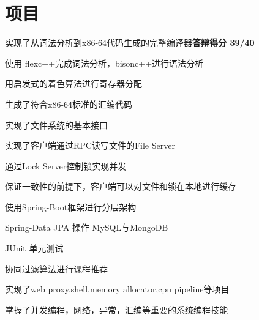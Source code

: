 \documentclass[]{deedy-resume-openfont}
\begin{document}
\begin{minipage}[t]{0.73\textwidth} 


\section{项目}
\sectionsep
{}
\vspace{\topsep}
\begin{tightemize}
    \item 实现了从词法分析到x86-64代码生成的完整编译器\textbf{答辩得分 39/40}
    \item 使用 flexc++完成词法分析，bisonc++进行语法分析
    \item 用启发式的着色算法进行寄存器分配
    \item 生成了符合x86-64标准的汇编代码
\end{tightemize}
\sectionsep
\sectionsep

\begin{tightemize}
\item 实现了文件系统的基本接口
\item 实现了客户端通过RPC读写文件的File Server
\item 通过Lock Server控制锁实现并发
\item 保证一致性的前提下，客户端可以对文件和锁在本地进行缓存
\end{tightemize}
\sectionsep
\sectionsep

\begin{tightemize}
\item 使用Spring-Boot框架进行分层架构
\item Spring-Data JPA 操作 MySQL与MongoDB
\item JUnit 单元测试
\item 协同过滤算法进行课程推荐
\end{tightemize}
\sectionsep
\sectionsep

\begin{tightemize}
\item 实现了web proxy,shell,memory allocator,cpu pipeline等项目
\item 掌握了并发编程，网络，异常，汇编等重要的系统编程技能
\end{tightemize}
\sectionsep
\sectionsep


\end{minipage}
\end{document}
